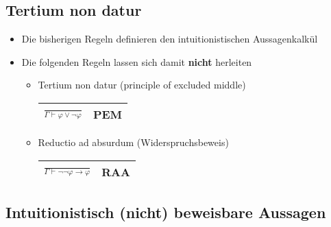 \documentclass{scrartcl}
\begin{document}
\subsection{Tertium non datur}

\normalsize
\begin{itemize}
	\item Die bisherigen Regeln definieren den intuitionistischen Aussagenkalkül
	\item Die folgenden Regeln lassen sich damit \textbf{nicht} herleiten
	\begin{itemize}
		\item Tertium non datur (principle of excluded middle) \\
		\begin{tabular}{|c|c|}
			\hline 
			$ \frac{}{\Gamma \vdash \varphi \vee \neg \varphi} $ & PEM \\ 
			\hline 
		\end{tabular} 
		\item Reductio ad absurdum (Widerspruchsbeweis) \\
		\begin{tabular}{|c|c|}
			\hline 
			$ \frac{}{\Gamma \vdash \neg \neg \varphi \rightarrow \varphi} $ & RAA \\ 
			\hline 
		\end{tabular} 
	\end{itemize}
\end{itemize}

\subsection{Intuitionistisch (nicht) beweisbare Aussagen}
\end{document}

